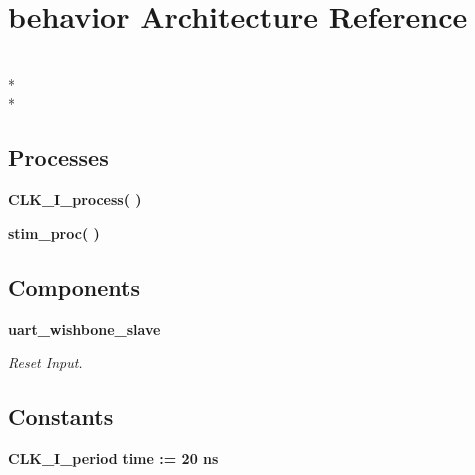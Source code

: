 \section{behavior Architecture Reference}
\label{classtest_uart__wishbone__slave_1_1behavior}
\\*
\\*
\subsection*{Processes}
 \begin{DoxyCompactItemize}
\item 
{\bf C\-L\-K\-\_\-\-I\-\_\-process}{\bfseries  (  )}\label{classtest_uart__wishbone__slave_1_1behavior_ae6956df8a9f0a3de7db54c4ad6fe3299}

\item 
{\bf stim\-\_\-proc}{\bfseries  (  )}\label{classtest_uart__wishbone__slave_1_1behavior_ad2efa6785cff833c341e27596b21aeb5}

\end{DoxyCompactItemize}
\subsection*{Components}
 \begin{DoxyCompactItemize}
\item 
{\bf uart\-\_\-wishbone\-\_\-slave}  {\bfseries }  
\begin{DoxyCompactList}\small\item\em Reset Input. \end{DoxyCompactList}\end{DoxyCompactItemize}
\subsection*{Constants}
 \begin{DoxyCompactItemize}
\item 
{\bf C\-L\-K\-\_\-\-I\-\_\-period} {\bfseries time  \-:=  20  ns } \label{classtest_uart__wishbone__slave_1_1behavior_aaba2bb0049306c18f246a63f6bc9c712}

\end{DoxyCompactItemize}

